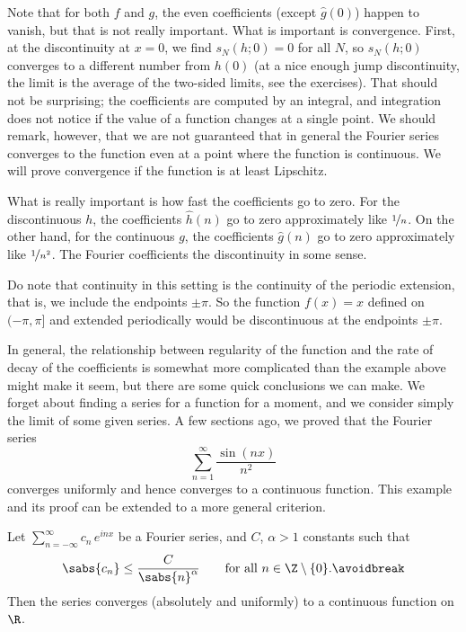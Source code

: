 \begin{example}
Note that for both $f$ and $g$, the even coefficients (except $\hat{g}(0)$)
happen to vanish, but that is not really important.
What is important is convergence.
First, at the discontinuity at $x=0$, we find $s_N(h;0) = 0$
for all $N$, so $s_N(h;0)$ converges
to a different number from $h(0)$ (at a nice enough jump discontinuity, the
limit is the average of the two-sided limits, see the exercises).
That should not be surprising;
the coefficients are computed by an integral, and integration
does not notice if the value of a function changes at a single point.
We should remark, however, that we are not guaranteed that in general
the Fourier series converges to the function even at a point where
the function is continuous.
We will prove convergence if the function is at least Lipschitz.

What is really important is how fast the coefficients go to zero.  For the
discontinuous $h$, the coefficients $\hat{h}(n)$ go to zero approximately like
$\nicefrac{1}{n}$.  On the other hand, for the continuous $g$,
the coefficients $\hat{g}(n)$ go to zero approximately like
$\nicefrac{1}{n^2}$.
The Fourier coefficients 
the discontinuity in some sense.

Do note that continuity in this setting is the continuity of the
periodic extension, that is, we include the endpoints $\pm \pi$.
So the function $f(x) = x$ defined on $(-\pi,\pi]$
and extended periodically would be discontinuous at the endpoints $\pm\pi$.
\end{example}

In general, the relationship between regularity of the function and
the rate of decay of the coefficients is somewhat more complicated
than the example above
might make it seem, but there are some quick conclusions we can make.
We forget about finding a series for a function for a moment,
and we consider simply the limit of some given series.
A few sections ago, we proved that the Fourier series 
\begin{equation*}
\sum_{n=1}^\infty \frac{\sin(nx)}{n^2}
\end{equation*}
converges uniformly and hence converges to a continuous function.  This 
example and its proof can be extended to a more general criterion.

\begin{prop}
Let $\sum_{n=-\infty}^\infty c_n\, e^{inx}$ be a Fourier series,
and $C$, $\alpha > 1$ constants such that
\begin{equation*}
\sabs{c_n} \leq \frac{C}{\sabs{n}^\alpha}
\qquad \text{for all } n \in \Z \setminus \{ 0 \}.
\avoidbreak
\end{equation*}
Then the series converges (absolutely and uniformly) to a continuous function on $\R$.
\end{prop}

